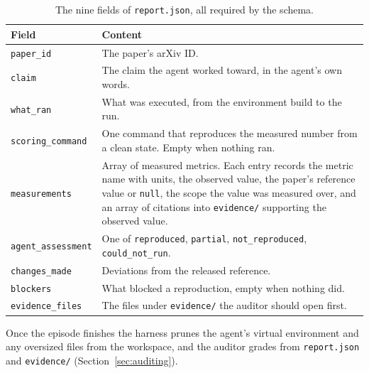 \begin{table}[ht]
\centering
\small
\renewcommand{\arraystretch}{1.15}
\begin{tabular}{@{}l>{\raggedright\arraybackslash}p{9.2cm}@{}}
\toprule
Field & Content \\
\midrule
\texttt{paper\_id} & The paper's arXiv ID. \\
\texttt{claim} & The claim the agent worked toward, in the agent's own words. \\
\texttt{what\_ran} & What was executed, from the environment build to
the run. \\
\texttt{scoring\_command} & One command that reproduces the measured number from
a clean state. Empty when nothing ran. \\
\texttt{measurements} & Array of measured metrics. Each entry records the metric
name with units, the observed value, the paper's reference value or
\texttt{null}, the scope the value was measured over, and an array of citations
into \texttt{evidence/} supporting the observed value. \\
\texttt{agent\_assessment} & One of \texttt{reproduced}, \texttt{partial},
\texttt{not\_reproduced}, \texttt{could\_not\_run}. \\
\texttt{changes\_made} & Deviations from the released reference. \\
\texttt{blockers} & What blocked a reproduction, empty when nothing did. \\
\texttt{evidence\_files} & The files under \texttt{evidence/} the auditor should
open first. \\
\bottomrule
\end{tabular}
\caption{The nine fields of \texttt{report.json}, all required by the schema.}
\label{tab:report-schema}
\end{table}

Once the episode finishes the harness prunes the agent's virtual environment
and any oversized files from the workspace, and the auditor grades from
\texttt{report.json} and \texttt{evidence/} (Section~\ref{sec:auditing}).


